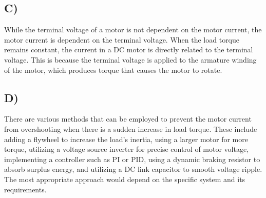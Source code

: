 \documentclass[letterpaper,12pt]{article}
\begin{document}
\subsection{C)}
While the terminal voltage of a motor is not dependent on the motor current, the motor current is dependent on the terminal voltage. When the load torque remains constant, the current in a DC motor is directly related to the terminal voltage. This is because the terminal voltage is applied to the armature winding of the motor, which produces torque that causes the motor to rotate.
\subsection{D)}
There are various methods that can be employed to prevent the motor current from overshooting when there is a sudden increase in load torque. These include adding a flywheel to increase the load's inertia, using a larger motor for more torque, utilizing a voltage source inverter for precise control of motor voltage, implementing a controller such as PI or PID, using a dynamic braking resistor to absorb surplus energy, and utilizing a DC link capacitor to smooth voltage ripple. The most appropriate approach would depend on the specific system and its requirements. 
\end{document}
